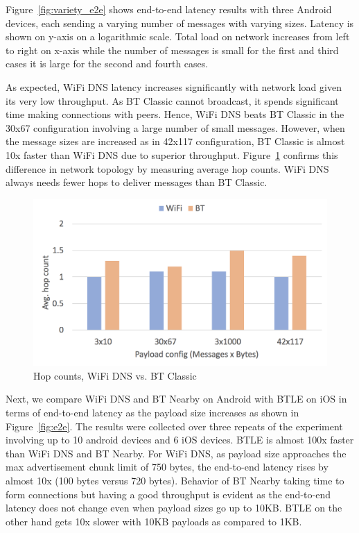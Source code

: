 \documentclass[conference]{IEEEtran}
\begin{document}
Figure~\ref{fig:variety_e2e} shows end-to-end latency results with
three Android devices, each sending a varying number of messages with
varying sizes. Latency is shown on y-axis on a logarithmic
scale. Total load on network increases from left to right on x-axis
while the number of messages is small for the first and third
cases it is large for the second and fourth cases.

As expected, WiFi DNS latency increases significantly with network
load given its very low throughput. As BT Classic cannot broadcast, it
spends significant time making connections with peers.  Hence, WiFi
DNS beats BT Classic in the 30x67 configuration involving a large
number of small messages. However, when the message sizes are
increased as in 42x117 configuration, BT Classic is almost 10x faster
than WiFi DNS due to superior
throughput. Figure~\ref{fig:variety_hops} confirms this difference in
network topology by measuring average hop counts. WiFi DNS always
needs fewer hops to deliver messages than BT Classic.
%
\begin{figure}[htbp]
\centerline{\includegraphics[width=0.8\columnwidth]{figs/variety_hops}}
\caption{Hop counts, WiFi DNS vs. BT Classic}
\label{fig:variety_hops}
\end{figure}
%

Next, we compare WiFi DNS and BT Nearby on Android with BTLE on iOS in
terms of end-to-end latency as the payload size increases as shown
in Figure~\ref{fig:e2e}. The results were collected over three repeats
of the experiment involving up to 10 android devices and 6 iOS
devices. BTLE is almost 100x faster than WiFi DNS and BT Nearby. For
WiFi DNS, as payload size approaches the max advertisement chunk limit
of 750 bytes, the end-to-end latency rises by almost 10x (100 bytes
versus 720 bytes). Behavior of BT Nearby taking time to form
connections but having a good throughput is evident as the end-to-end
latency does not change even when payload sizes go up to 10KB. BTLE on
the other hand gets 10x slower with 10KB payloads as compared to 1KB.
\end{document}
